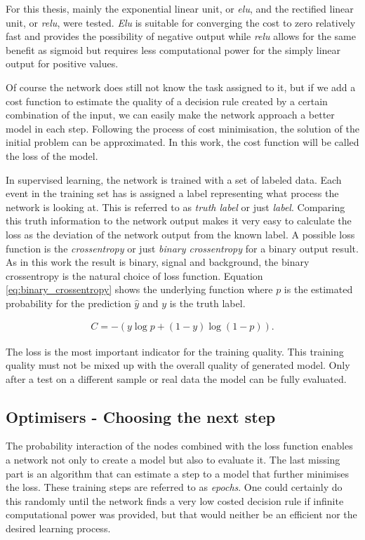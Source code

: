 For this thesis, mainly the exponential linear unit, or \textit{elu}, and the rectified linear unit, or \textit{relu}, were tested.
\textit{Elu} is suitable for converging the cost to zero relatively fast and provides the possibility of negative output while \textit{relu} allows for the same benefit as sigmoid but  requires less computational power for the simply linear output for positive values.

Of course the network does still not know the task assigned to it, but if we add a cost function to estimate the quality of a decision rule created by a certain combination of the input, we can easily make the network approach a better model in each step. Following the process of cost minimisation, the solution of the initial problem can be approximated.
In this work, the cost function will be called the loss of the model.

In supervised learning, the network is trained with a set of labeled data. Each event in the training set has is assigned a label representing what process the network is looking at. This is referred to as \emph{truth label} or just \emph{label}. Comparing this truth information to the network output makes it very easy to calculate the loss as the deviation of the network output from the known label. A possible loss function is the \emph{crossentropy} or just \emph{binary crossentropy} for a binary output result. As in this work the result is binary, signal and background, the binary crossentropy is the natural choice of loss function. Equation \eqref{eq:binary_crossentropy} shows the underlying function where $p$ is the estimated probability for the prediction $\hat{y}$ and $y$ is the truth label.

\begin{align}
    C = -(y \log p + (1 - y) \log (1 - p) ).
    \label{eq:binary_crossentropy}
\end{align}

The loss is the most important indicator for the training quality. This training quality must not be mixed up with the overall quality of generated model. Only after a test on a different sample or real data the model can be fully evaluated.

\subsection{Optimisers - Choosing the next step}
\label{sec:optimisation}

The probability interaction of the nodes combined with the loss function enables a network not only to create a model but also to evaluate it. The last missing part is an algorithm that can estimate a step to a model that further minimises the loss. These training steps are referred to as \emph{epochs}. One could certainly do this randomly until the network finds a very low costed decision rule if infinite computational power was provided, but that would neither be an efficient nor the desired learning process.


